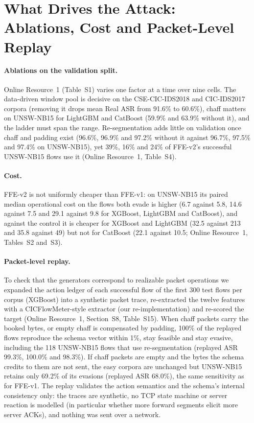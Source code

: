 \section{What Drives the Attack: Ablations, Cost and Packet-Level Replay}
\label{sec:ablation}

\paragraph{Ablations on the validation split.} Online Resource~1 (Table~S1) varies one factor at a time over nine cells. The data-driven window pool is decisive on the CSE-CIC-IDS2018 and CIC-IDS2017 corpora (removing it drops mean Real ASR from 91.6\% to 60.6\%), chaff matters on UNSW-NB15 for LightGBM and CatBoost (59.9\% and 63.9\% without it), and the ladder must span the range. Re-segmentation adds little on validation once chaff and padding exist (96.6\%, 96.9\% and 97.2\% without it against 96.7\%, 97.5\% and 97.4\% on UNSW-NB15), yet 39\%, 16\% and 24\% of FFE-v2's successful UNSW-NB15 flows use it (Online Resource~1, Table~S4).

\paragraph{Cost.} FFE-v2 is not uniformly cheaper than FFE-v1: on UNSW-NB15 its paired median operational cost on the flows both evade is higher (6.7 against 5.8, 14.6 against 7.5 and 29.1 against 9.8 for XGBoost, LightGBM and CatBoost), and against the control it is cheaper for XGBoost and LightGBM (32.5 against 213 and 35.8 against 49) but not for CatBoost (22.1 against 10.5; Online Resource~1, Tables~S2 and~S3).

\paragraph{Packet-level replay.} To check that the generators correspond to realizable packet operations we expanded the action ledger of each successful flow of the first 300 test flows per corpus (XGBoost) into a synthetic packet trace, re-extracted the twelve features with a CICFlowMeter-style extractor (our re-implementation) and re-scored the target (Online Resource~1, Section~S8, Table~S15). When chaff packets carry the booked bytes, or empty chaff is compensated by padding, 100\% of the replayed flows reproduce the schema vector within 1\%, stay feasible and stay evasive, including the 118 UNSW-NB15 flows that use re-segmentation (replayed ASR 99.3\%, 100.0\% and 98.3\%). If chaff packets are empty and the bytes the schema credits to them are not sent, the easy corpora are unchanged but UNSW-NB15 retains only 69.2\% of its evasions (replayed ASR 68.0\%), the same sensitivity as for FFE-v1. The replay validates the action semantics and the schema's internal consistency only: the traces are synthetic, no TCP state machine or server reaction is modelled (in particular whether more forward segments elicit more server ACKs), and nothing was sent over a network.
